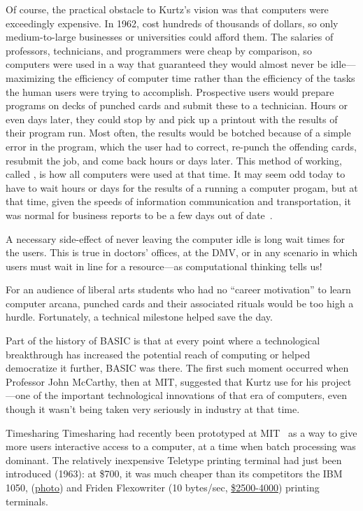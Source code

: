 Of course, the practical obstacle to Kurtz's vision was that
computers were exceedingly expensive.  In 1962,  
cost hundreds of thousands of dollars, so only medium-to-large 
businesses or universities could afford them.  
The salaries of professors, technicians, and programmers were
cheap by comparison, so computers were used in a way that guaranteed
they would almost never be idle---maximizing the efficiency of computer
time rather than the efficiency of the tasks the human users were trying
to accomplish.
Prospective users would prepare programs on decks of punched
cards and submit these to a technician.  
Hours or even days later, they
could stop by and pick up a printout with the results of their program run.
Most often, the results would be botched because of a simple error in
the program, which the user had to correct, re-punch the offending
cards, resubmit the job, and come back hours or days later.  This method
of working, called , is how all computers were used
at that time.  
It may seem odd today to have to wait hours or days for the results of a
running a computer progam, but at that time, given the speeds of information communication and
transportation, it was  normal for business
reports to be a few days out of date~\cite{ceruzzi}.

  \begin{geeknote}
  A necessary side-effect of never leaving the computer idle is long wait
  times for the users.  This is true in doctors' offices, at the DMV, or
  in any scenario in which users must wait in line for a resource---as
  computational thinking tells us!
  \end{geeknote}

For an audience of liberal arts students who had no ``career
motivation'' to learn computer arcana, punched cards and their associated
rituals would be too high a hurdle.
Fortunately, a technical milestone helped save the day.

Part of the history of BASIC is that at every point where a
technological breakthrough has increased the potential reach of
computing or helped democratize it further, BASIC was there.  The first
such moment occurred when
Professor John McCarthy, then at MIT, suggested that Kurtz use
  for his project---one of the important technological
innovations of that era of computers, even though it wasn't being taken
very seriously in industry at that time.

\begin{milestone}{Timesharing}
Timesharing had recently been prototyped at
MIT~\cite{corbato62timesharing} as a way to give more users interactive
access to a computer, at a time when
batch processing was dominant.
The relatively inexpensive Teletype
 printing terminal had just been introduced (1963): at \$700,
it was much cheaper than its competitors the IBM 1050, 
(\href{http://www.science.uva.nl/museum/ibm1050.php}{photo}) and
Friden Flexowriter (10 bytes/sec,
\href{http://retrotechnology.com/herbs_stuff/flex_behr.html}{\$2500-4000})
printing terminals.
\end{milestone}

